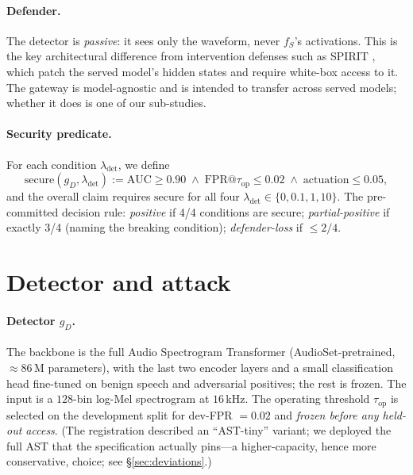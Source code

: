 \documentclass[letterpaper,twocolumn,10pt]{article}
\newcommand{\lam}{\lambda_{\mathrm{det}}}
\newcommand{\gd}{g_{D}}
\newcommand{\fs}{f_{S}}
\newcommand{\taop}{\tau_{\mathrm{op}}}
\begin{document}
\paragraph{Defender.} The detector is \emph{passive}: it sees only the waveform,
never $\fs$'s activations. This is the key architectural difference from
intervention defenses such as SPIRIT \cite{spirit}, which patch the served
model's hidden states and require white-box access to it. The gateway is
model-agnostic and is intended to transfer across served models; whether it does
is one of our sub-studies.

\paragraph{Security predicate.} For each condition $\lam$, we define
\[
\mathrm{secure}(\gd,\lam) := \mathrm{AUC}\geq 0.90 \;\wedge\;
\mathrm{FPR}@\taop \leq 0.02 \;\wedge\; \mathrm{actuation} \leq 0.05,
\]
and the overall claim requires $\mathrm{secure}$ for all four
$\lam \in \{0,0.1,1,10\}$. The pre-committed decision rule: \emph{positive} if
4/4 conditions are secure; \emph{partial-positive} if exactly 3/4 (naming the
breaking condition); \emph{defender-loss} if $\leq 2/4$.

\section{Detector and attack}
\paragraph{Detector $\gd$.} The backbone is the full Audio Spectrogram Transformer
\cite{ast} (AudioSet-pretrained, $\approx$86\,M parameters), with the last two
encoder layers and a small classification head fine-tuned on benign speech and
adversarial positives; the rest is frozen. The input is a $128$-bin log-Mel
spectrogram at $16$\,kHz. The operating threshold $\taop$ is selected on the
development split for dev-FPR $=0.02$ and \emph{frozen before any held-out
access}. (The registration described an ``AST-tiny'' variant; we deployed the
full AST that the specification actually pins---a higher-capacity, hence more
conservative, choice; see \S\ref{sec:deviations}.)
\end{document}
